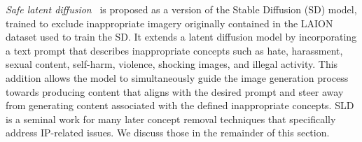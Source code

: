 \documentclass[conference,table]{IEEEtran} %
\begin{document}
\textit{Safe latent diffusion}~\cite{schramowski_safe_2023} is proposed as a version of the Stable Diffusion (SD) model, trained to exclude inappropriate imagery originally contained in the LAION dataset used to train the SD. 
It extends a latent diffusion model by incorporating a text prompt that describes inappropriate concepts such as hate, harassment, sexual content, self-harm, violence, shocking images, and illegal activity.
This addition allows the model to simultaneously guide the image generation process towards producing content that aligns with the desired prompt and steer away from generating content associated with the defined inappropriate concepts.
SLD is a seminal work for many later concept removal techniques that specifically address IP-related issues. We discuss those in the remainder of this section.


\end{document}
